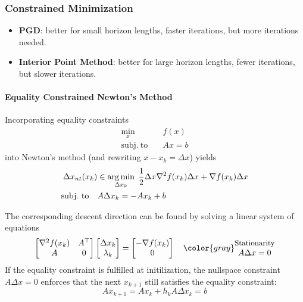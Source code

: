 \subsubsection{Constrained Minimization}
\begin{itemize}
    \item \textbf{PGD}: better for small horizon lengths, faster iterations, but more iterations needed.
    \item \textbf{Interior Point Method}: better for large horizon lengths, fewer iterations, but slower iterations.
\end{itemize}

\paragraph{Equality Constrained Newton's Method}
Incorporating equality constraints
\noindent\begin{align*}
    \min_x \quad            & f(x) \\
    \mathrm{subj.\ to}\quad & Ax=b
\end{align*}
into Newton's method (and rewriting $x-x_k = \Delta x$) yields
\begin{align*}
    \Delta x_{nt}(x_k)       & \in \operatorname*{arg\,min}_{\Delta x_k} \; \frac{1}{2} \Delta x \nabla^2 f(x_k) \Delta x + \nabla f(x_k)\Delta x \\
    \mathrm{subj.\ to} \quad & A\Delta x_k = -Ax_k + b
\end{align*}

\newpar{}

The corresponding descent direction can be found by solving a linear system of equations
\begin{equation*}
    \begin{bmatrix}
        \nabla^2 f(x_k) & A^\top \\
        A               & 0
    \end{bmatrix}\begin{bmatrix}
        \Delta x_k \\
        \lambda_k
    \end{bmatrix}
    = \begin{bmatrix}
        -\nabla f(x_k) \\
        0
    \end{bmatrix} \quad {\color{gray}\begin{matrix}
            \text{\small{Stationarity}} \\
            A\Delta x = 0
        \end{matrix}}
\end{equation*}
\newpar{}
If the equality constraint is fulfilled at initilization, the nullspace constraint $A\Delta x = 0$ enforces that the next $x_{k+1}$ still satisfies the equality constraint:
\begin{equation*}
    Ax_{k+1} = Ax_k + h_k A\Delta x_k = b
\end{equation*}

